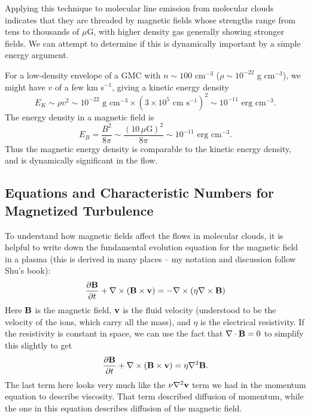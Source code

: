 Applying this technique to molecular line emission from molecular clouds indicates that they are threaded by magnetic fields whose strengths range from tens to thousands of $\mu$G, with higher density gas generally showing stronger fields. We can attempt to determine if this is dynamically important by a simple energy argument.

For a low-density envelope of a GMC with $n\sim 100$ cm$^{-3}$ ($\rho \sim 10^{-22}$ g cm$^{-3}$), we might have $v$ of a few km s$^{-1}$, giving a kinetic energy density
\begin{equation}
E_K \sim \rho v^2 \sim 10^{-22}\mbox{ g cm}^{-3} \times (3\times 10^5\mbox{ cm s}^{-1})^2\sim 10^{-11}\mbox{ erg cm}^{-3}.
\end{equation}
The energy density in a magnetic field is
\begin{equation}
E_B = \frac{B^2}{8\pi} \sim \frac{(10\,\mu\mbox{G})^2}{8\pi} \sim 10^{-11} \mbox{ erg cm}^{-3}.
\end{equation}
Thus the magnetic energy density is comparable to the kinetic energy density, and is dynamically significant in the flow.

\subsection{Equations and Characteristic Numbers for Magnetized Turbulence}

To understand how magnetic fields affect the flows in molecular clouds, it is helpful to write down the fundamental evolution equation for the magnetic field in a plasma (this is derived in many places -- my notation and discussion follow Shu's book):
\begin{equation}
\frac{\partial \mathbf{B}}{\partial t} + \nabla \times (\mathbf{B} \times \mathbf{v}) = -\nabla \times (\eta \nabla \times \mathbf{B})
\end{equation}
Here $\mathbf{B}$ is the magnetic field, $\mathbf{v}$ is the fluid velocity (understood to be the velocity of the ions, which carry all the mass), and $\eta$ is the electrical resistivity. If the resistivity is constant in space, we can use the fact that $\nabla \cdot \mathbf{B}=0$ to simplify this slightly to get
\begin{equation}
\frac{\partial \mathbf{B}}{\partial t} + \nabla \times (\mathbf{B} \times \mathbf{v}) = \eta \nabla^2 \mathbf{B}.
\end{equation}
The last term here looks very much like the $\nu\nabla^2 \mathbf{v}$ term we had in the momentum equation to describe viscosity. That term described diffusion of momentum, while the one in this equation describes diffusion of the magnetic field.

